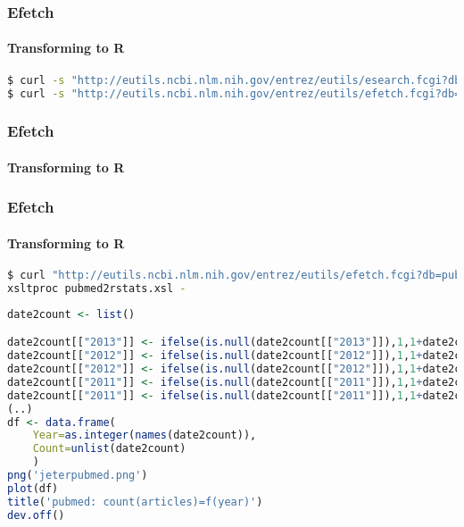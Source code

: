 \documentclass{beamer}
\begin{document}
\begin{frame}[fragile]
\frametitle{Efetch}
\framesubtitle{Transforming to R}
\begin{lstlisting}[language=bash,basicstyle=\tiny,breaklines=true,escapechar=\!]
$ curl -s "http://eutils.ncbi.nlm.nih.gov/entrez/eutils/esearch.fcgi?db=pubmed&term=Tyrannosaurus&usehistory=true" | xmllint --format -
$ curl -s "http://eutils.ncbi.nlm.nih.gov/entrez/eutils/efetch.fcgi?db=pubmed&usehistory=true&WebEnv=NCID_1_52434791_130.14.22.215_9001_1375957034_1619786167&query_key=1&retmode=xml"
\end{lstlisting}
\end{frame}


\begin{frame}[fragile]
\frametitle{Efetch}
\framesubtitle{Transforming to R}

\end{frame}

\begin{frame}[fragile]
\frametitle{Efetch}
\framesubtitle{Transforming to R}

\begin{lstlisting}[language=bash,basicstyle=\tiny,breaklines=true,escapechar=\!]
$ curl "http://eutils.ncbi.nlm.nih.gov/entrez/eutils/efetch.fcgi?db=pubmed&usehistory=true&WebEnv=NCID_1_52434791_130.14.22.215_9001_1375957034_1619786167&query_key=1&retmode=xml" |\
xsltproc pubmed2rstats.xsl -
\end{lstlisting}

\begin{lstlisting}[language=R,basicstyle=\tiny,breaklines=true,escapechar=\!]
date2count <- list()

date2count[["2013"]] <- ifelse(is.null(date2count[["2013"]]),1,1+date2count[["2013"]])
date2count[["2012"]] <- ifelse(is.null(date2count[["2012"]]),1,1+date2count[["2012"]])
date2count[["2012"]] <- ifelse(is.null(date2count[["2012"]]),1,1+date2count[["2012"]])
date2count[["2011"]] <- ifelse(is.null(date2count[["2011"]]),1,1+date2count[["2011"]])
date2count[["2011"]] <- ifelse(is.null(date2count[["2011"]]),1,1+date2count[["2011"]])
(..)
df <- data.frame(
	Year=as.integer(names(date2count)),
	Count=unlist(date2count)
	)
png('jeterpubmed.png')
plot(df)
title('pubmed: count(articles)=f(year)')
dev.off()
\end{lstlisting}

\end{frame}
\end{document}
